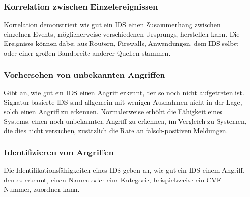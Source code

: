 \subsubsection{Korrelation zwischen Einzelereignissen }
Korrelation demonstriert wie gut ein IDS einen Zusammenhang zwischen einzelnen Events, möglicherweise verschiedenen Ursprungs, herstellen kann. Die Ereignisse können dabei aus Routern, Firewalls, Anwendungen, dem IDS selbst oder einer großen Bandbreite anderer Quellen stammen.
\subsubsection{Vorhersehen von unbekannten Angriffen}
Gibt an, wie gut ein IDS einen Angriff erkennt, der so noch nicht aufgetreten ist. Signatur-basierte IDS sind allgemein mit wenigen Ausnahmen nicht in der Lage, solch einen Angriff zu erkennen. Normalerweise erhöht die Fähigkeit eines Systems, einen noch unbekannten Angriff zu erkennen, im Vergleich zu Systemen, die dies nicht versuchen, zusätzlich die Rate an falsch-positiven Meldungen.
\subsubsection{Identifizieren von Angriffen}
Die Identifikationsfähigkeiten eines IDS  geben an, wie gut ein IDS einem Angriff, den es erkennt, einen Namen oder eine Kategorie, beispielsweise ein CVE-Nummer, zuordnen kann.
